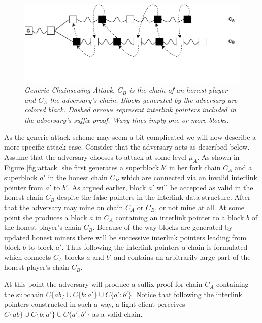 \begin{figure}[h]
	\begin{center}
		\includegraphics[scale=0.75]{figures/generic_chainsewing_attack.pdf}
	\end{center}
	\caption{\textit{Generic Chainsewing Attack. $C_B$ is the chain of an honest player and $C_A$
	the adversary's chain. Blocks generated by the adversary are colored black. Dashed arrows
	represent interlink pointers included in the adversary's suffix proof. Wavy lines imply one
	or more blocks.}}
	\label{fig:generic_attack}
\end{figure}

As the generic attack scheme may seem a bit complicated we will now describe a more
specific attack case. Consider that the adversary acts as described below.
Assume that the adversary chooses to attack at some level $\mu_A$. As shown in
Figure \ref{fig:attack} she first generates a superblock $b'$ in her fork chain
$C_A$ and a superblock $a'$ in the honest chain $C_B$ which are connected via
an invalid interlink pointer from $a'$ to $b'$. As argued earlier, block $a'$
will be accepted as valid in the honest chain $C_B$ despite the false pointers
in the interlink data structure. After that the adversary may mine on chain $C_A$
or $C_B$, or not mine at all. At some point she produces a block $a$ in $C_A$
containing an interlink pointer to a block $b$ of the honest player's chain $C_B$.
Because of the way blocks are generated by updated honest miners there will be
successive interlink pointers leading from block $b$ to block $a'$. Thus following
the interlink pointers a chain is formulated which connects $C_A$ blocks $a$ and
$b'$ and contains an arbitrarily large part of the honest player's chain $C_B$.

At this point the adversary will produce a suffix proof for chain $C_A$ containing
the subchain $C\{ab\} \cup C\{b:a'\} \cup C\{a':b'\}$. Notice that following the
interlink pointers constructed in such a way, a light client perceives $C\{ab\}
\cup C\{b:a'\} \cup C\{a':b'\}$  as a valid chain.

